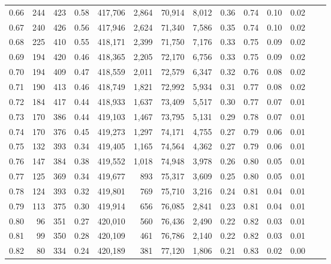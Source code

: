 \begin{tabular}{rrrrrrrrrrrrrr}
0.66 &     244 &    423 &    0.58 &  417,706 &    2,864 &  70,914 &   8,012 &  0.36 &  0.74 &  0.10 &      0.02 \\
0.67 &     240 &    426 &    0.56 &  417,946 &    2,624 &  71,340 &   7,586 &  0.35 &  0.74 &  0.10 &      0.02 \\
0.68 &     225 &    410 &    0.55 &  418,171 &    2,399 &  71,750 &   7,176 &  0.33 &  0.75 &  0.09 &      0.02 \\
0.69 &     194 &    420 &    0.46 &  418,365 &    2,205 &  72,170 &   6,756 &  0.33 &  0.75 &  0.09 &      0.02 \\
0.70 &     194 &    409 &    0.47 &  418,559 &    2,011 &  72,579 &   6,347 &  0.32 &  0.76 &  0.08 &      0.02 \\
0.71 &     190 &    413 &    0.46 &  418,749 &    1,821 &  72,992 &   5,934 &  0.31 &  0.77 &  0.08 &      0.02 \\
0.72 &     184 &    417 &    0.44 &  418,933 &    1,637 &  73,409 &   5,517 &  0.30 &  0.77 &  0.07 &      0.01 \\
0.73 &     170 &    386 &    0.44 &  419,103 &    1,467 &  73,795 &   5,131 &  0.29 &  0.78 &  0.07 &      0.01 \\
0.74 &     170 &    376 &    0.45 &  419,273 &    1,297 &  74,171 &   4,755 &  0.27 &  0.79 &  0.06 &      0.01 \\
0.75 &     132 &    393 &    0.34 &  419,405 &    1,165 &  74,564 &   4,362 &  0.27 &  0.79 &  0.06 &      0.01 \\
0.76 &     147 &    384 &    0.38 &  419,552 &    1,018 &  74,948 &   3,978 &  0.26 &  0.80 &  0.05 &      0.01 \\
0.77 &     125 &    369 &    0.34 &  419,677 &      893 &  75,317 &   3,609 &  0.25 &  0.80 &  0.05 &      0.01 \\
0.78 &     124 &    393 &    0.32 &  419,801 &      769 &  75,710 &   3,216 &  0.24 &  0.81 &  0.04 &      0.01 \\
0.79 &     113 &    375 &    0.30 &  419,914 &      656 &  76,085 &   2,841 &  0.23 &  0.81 &  0.04 &      0.01 \\
0.80 &      96 &    351 &    0.27 &  420,010 &      560 &  76,436 &   2,490 &  0.22 &  0.82 &  0.03 &      0.01 \\
0.81 &      99 &    350 &    0.28 &  420,109 &      461 &  76,786 &   2,140 &  0.22 &  0.82 &  0.03 &      0.01 \\
0.82 &      80 &    334 &    0.24 &  420,189 &      381 &  77,120 &   1,806 &  0.21 &  0.83 &  0.02 &      0.00 \\

\end{tabular}
